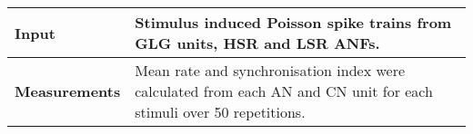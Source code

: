 {\begin{table}[ptb]
\begin{tabularx}{\textwidth}{|l|X|}
    \textbf{Input}      & Stimulus induced Poisson spike trains from GLG units, HSR and LSR ANFs.\\\hline
\textbf{Measurements}    &  
Mean rate and synchronisation index were calculated from each AN and CN unit for each stimuli over 50 repetitions.
\\\hline
\end{tabularx}
\end{table}
}





